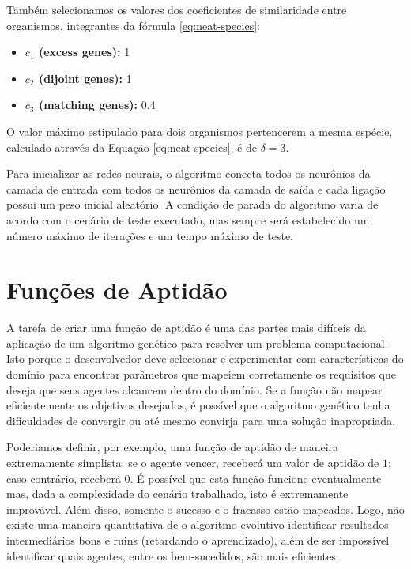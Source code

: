 Também selecionamos os valores dos coeficientes de similaridade entre
organismos, integrantes da fórmula \ref{eq:neat-species}:

\begin{itemize}
	\item \textbf{$c_1$ (excess genes):} 1
	\item \textbf{$c_2$ (dijoint genes):} 1
	\item \textbf{$c_3$ (matching genes):} 0.4
\end{itemize}

O valor máximo estipulado para dois organismos pertencerem a mesma espécie,
calculado através da Equação \ref{eq:neat-species}, é de $\delta = 3$.

Para inicializar as redes neurais, o algoritmo conecta todos os neurônios da
camada de entrada com todos os neurônios da camada de saída e cada ligação
possui um peso inicial aleatório. A condição de parada do algoritmo varia de
acordo com o cenário de teste executado, mas sempre será estabelecido um número
máximo de iterações e um tempo máximo de teste.


\section{\label{section:modelling-fitness}Funções de Aptidão}
A tarefa de criar uma função de aptidão é uma das partes mais difíceis da
aplicação de um algoritmo genético para resolver um problema computacional. Isto
porque o desenvolvedor deve selecionar e experimentar com características do
domínio para encontrar parâmetros que mapeiem corretamente os requisitos que
deseja que seus agentes alcancem dentro do domínio. Se a função não mapear
eficientemente os objetivos desejados, é possível que o algoritmo genético tenha
dificuldades de convergir ou até mesmo convirja para uma solução inapropriada.

Poderiamos definir, por exemplo, uma função de aptidão de maneira extremamente
simplista: se o agente vencer, receberá um valor de aptidão de $1$; caso
contrário, receberá $0$. É possível que esta função funcione eventualmente mas,
dada a complexidade do cenário trabalhado, isto é extremamente improvável. Além
disso, somente o sucesso e o fracasso estão mapeados. Logo, não existe uma
maneira quantitativa de o algoritmo evolutivo identificar resultados
intermediários bons e ruins (retardando o aprendizado), além de ser impossível
identificar quais agentes, entre os bem-sucedidos, são mais eficientes.

